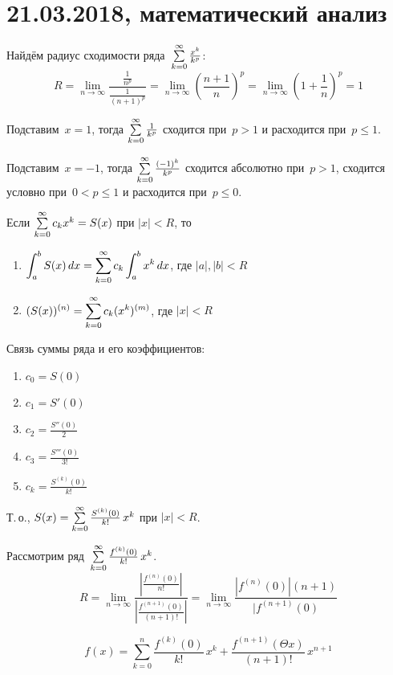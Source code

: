 \chapter{21.03.2018, математический анализ}
Найдём радиус сходимости ряда~$\series[0] \frac{x^k}{k^p}$:
\begin{equation*}
R = \lim_{n \to \infty} \frac{\frac1{n^p}}{\frac1{(n + 1)^p}} =
\lim_{n \to \infty} \left( \frac{n + 1}{n} \right)^p =
\lim_{n \to \infty} \left( 1 + \frac1n \right)^p = 1
\end{equation*}

Подставим~$x = 1$, тогда $\series[0] \frac1{k^p}$ сходится при~$p > 1$ и расходится при~$p \leqslant 1$.

Подставим~$x = -1$, тогда $\series[0] \frac{(-1)^k}{k^p}$ сходится абсолютно при~$p > 1$, сходится условно при~$0 < p \leqslant 1$ и расходится при~$p \leqslant 0$.

\begin{statement}
Если $\series[0] c_k x^k = S(x)$ при $|x| < R$, то
\begin{enumerate}
	\item $\displaystyle \int_a^b S(x)\,dx = \series[0] c_k \int_a^b x^k\,dx$, где $|a|, |b| < R$
	\item $\displaystyle (S(x))^{(n)} = \series[0] c_k (x^k)^{(m)}$, где $|x| < R$
\end{enumerate}
\end{statement}

Связь суммы ряда и его коэффициентов:
\begin{enumerate}
	\item $c_0 = S(0)$
	\item $c_1 = S'(0)$
	\item $c_2 = \frac{S''(0)}2$
	\item $c_3 = \frac{S'''(0)}{3!}$
	\item $c_k = \frac{S^{(k)}(0)}{k!}$
\end{enumerate}

Т.\,о., $S(x) = \series[0] \frac{S^{(k)}(0)}{k!}\,x^k$ при $|x| < R$.

Рассмотрим ряд~$\series[0] \frac{f^{(k)}(0)}{k!}\,x^k$.
\begin{equation*}
R = \lim_{n \to \infty} \frac
{\left| \frac{f^{(n)}(0)}{n!} \right|}
{\left| \frac{f^{(n+1)}(0)}{(n + 1)!} \right|} =
\lim_{n \to \infty} \frac{|f^{(n)}(0)| (n + 1)}{|f^{(n+1)}(0)}
\end{equation*}

\begin{equation*}
f(x) = \sum_{k=0}^n \frac{f^{(k)}(0)}{k!}\,x^k + \frac{f^{(n+1)}(\Theta x)}{(n + 1)!}\,x^{n+1}
\end{equation*}

